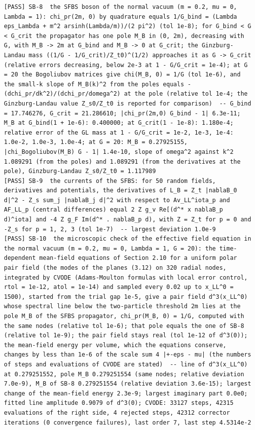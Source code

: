 \documentclass[
  10pt,
]{article}
\begin{document}
\begin{verbatim}
[PASS] SB-8  the SFBS boson of the normal vacuum (m = 0.2, mu = 0, Lambda = 1): chi_pr(2m, 0) by quadrature equals 1/G_bind = (Lambda eps_Lambda + m^2 arsinh(Lambda/m))/(2 pi^2) (tol 1e-8); for G_bind < G < G_crit the propagator has one pole M_B in (0, 2m), decreasing with G, with M_B -> 2m at G_bind and M_B -> 0 at G_crit; the Ginzburg-Landau mass ((1/G - 1/G_crit)/Z_t0)^(1/2) approaches it as G -> G_crit (relative errors decreasing, below 2e-3 at 1 - G/G_crit = 1e-4); at G = 20 the Bogoliubov matrices give chi(M_B, 0) = 1/G (tol 1e-6), and the small-k slope of M_B(k)^2 from the poles equals -(dchi_pr/dk^2)/(dchi_pr/domega^2) at the pole (relative tol 1e-4; the Ginzburg-Landau value Z_s0/Z_t0 is reported for comparison)  -- G_bind = 17.746276, G_crit = 21.286610; |chi_pr(2m,0) G_bind - 1| 6.3e-11; M_B at G_bind(1 + 1e-6): 0.400000; at G_crit(1 - 1e-8): 1.180e-4; relative error of the GL mass at 1 - G/G_crit = 1e-2, 1e-3, 1e-4: 1.0e-2, 1.0e-3, 1.0e-4; at G = 20: M_B = 0.27925155, |chi_Bogoliubov(M_B) G - 1| 1.4e-10, slope of omega^2 against k^2 1.089291 (from the poles) and 1.089291 (from the derivatives at the pole), Ginzburg-Landau Z_s0/Z_t0 = 1.117989
[PASS] SB-9  the currents of the SFBS: for 50 random fields, derivatives and potentials, the derivatives of L_B = Z_t |nablaB_0 d|^2 - Z_s sum_j |nablaB_j d|^2 with respect to Av_LL^iota_p and AF_LL_p (central differences) equal 2 Z g_v Re[(d^* x nablaB_p d)^iota] and -4 Z g_F Im(d^* . nablaB_p d), with Z = Z_t for p = 0 and -Z_s for p = 1, 2, 3 (tol 1e-7)  -- largest deviation 1.0e-9
[PASS] SB-10  the microscopic check of the effective field equation in the normal vacuum (m = 0.2, mu = 0, Lambda = 1, G = 20): the time-dependent mean-field equations of Section 2.10 for a uniform polar pair field (the modes of the planes (3.12) on 320 radial nodes, integrated by CVODE (Adams-Moulton formulas with local error control, rtol = 1e-12, atol = 1e-14) and sampled every 0.02 up to x_LL^0 = 1500), started from the trial gap 1e-5, give a pair field d^3(x_LL^0) whose spectral line below the two-particle threshold 2m lies at the pole M_B of the SFBS propagator, chi_pr(M_B, 0) = 1/G, computed with the same nodes (relative tol 1e-6); that pole equals the one of SB-8 (relative tol 1e-9); the pair field stays real (tol 1e-12 of d^3(0)); the mean-field energy per volume, which the equations conserve, changes by less than 1e-6 of the scale sum 4 |+-eps - mu| (the numbers of steps and evaluations of CVODE are stated)  -- line of d^3(x_LL^0) at 0.279251552, pole M_B 0.279251554 (same nodes; relative deviation 7.0e-9), M_B of SB-8 0.279251554 (relative deviation 3.6e-15); largest change of the mean-field energy 2.3e-9; largest imaginary part 0.0e0; fitted line amplitude 0.9079 of d^3(0); CVODE: 33127 steps, 42315 evaluations of the right side, 4 rejected steps, 42312 corrector iterations (0 convergence failures), last order 7, last step 4.5314e-2

\end{verbatim}
\end{document}
